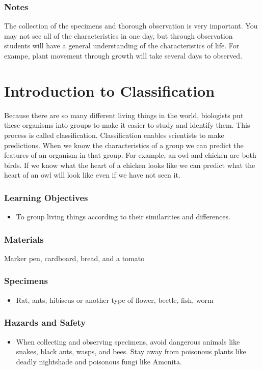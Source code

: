 \subsubsection*{Notes}
The collection of the specimens and thorough observation is very important. You may not see all of the characteristics in one day, but through observation students will have a general understanding of the characteristics of life. For exampe, plant movement through growth will take several days to observed.


\section{Introduction to Classification}
Because there are so many different living things in the world, biologists put these organisms into groups to make it easier to study and identify them. This process is called classification. Classification enables scientists to make predictions. When we know the characteristics of a group we can predict the features of an organism in that group. For example, an owl and chicken are both birds. If we know what the heart of a chicken looks like we can predict what the heart of an owl will look like even if we have not seen it.

\subsubsection*{Learning Objectives}
\begin{itemize}
\item{To group living things according to their similarities and differences.}
\end{itemize}

\subsubsection*{Materials}
Marker pen, cardboard, bread, and a tomato

\subsubsection*{Specimens}
\begin{itemize}
\item{Rat, ants, hibiscus or another type of flower, beetle, fish, worm}
\end{itemize}

\subsubsection*{Hazards and Safety}
\begin{itemize}
\item{When collecting and observing specimens, avoid dangerous animals like snakes, black ants, wasps, and bees. Stay away from poisonous plants like deadly nightshade and poisonous fungi like Amonita.}
\end{itemize}

